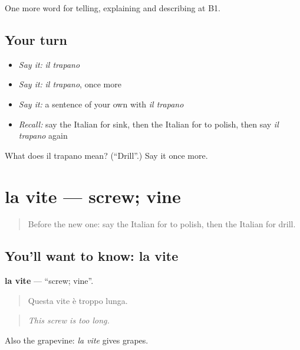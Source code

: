\begin{grammarlens}[title={What you've built}]
One more word for telling, explaining and describing at B1.
\end{grammarlens}

\subsection*{Your turn}
\begin{itemize}
\raggedright
  \item \emph{Say it:} \emph{il trapano}
  \item \emph{Say it:} \emph{il trapano}, once more
  \item \emph{Say it:} a sentence of your own with \emph{il trapano}
  \item \emph{Recall:} say the Italian for sink, then the Italian for to polish, then say \emph{il trapano} again
\end{itemize}

\begin{tcolorbox}[breakable,colback=teal!4,colframe=teal!35!black,title={Before you move on}]
What does il trapano mean? (\textquotedblleft{}Drill\textquotedblright{}.) Say it once more.
\end{tcolorbox}
\section[la vite]{la vite — screw; vine}

\label{lesson:IT-C535-vite}



\begin{quote}
Before the new one: say the Italian for to polish, then the Italian for drill.
\end{quote}

\subsection*{You'll want to know: la vite}
\textbf{la vite} — \textquotedblleft{}screw; vine\textquotedblright{}.

\begin{quote}
Questa vite è troppo lunga.
\end{quote}

\begin{quote}
\emph{This screw is too long.}
\end{quote}

Also the grapevine: \emph{la vite} gives grapes.

